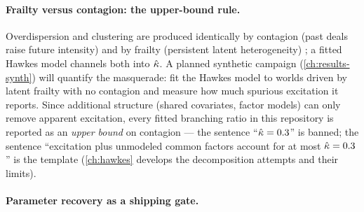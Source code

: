 \paragraph{Frailty versus contagion: the upper-bound rule.}
Overdispersion and clustering are produced identically by contagion
(past deals raise future intensity) and by frailty (persistent latent
heterogeneity) \citep{duffie2009,azizpour2018}; a fitted Hawkes model
channels both into $\hat{\kappa}$. A planned synthetic campaign
(\cref{ch:results-synth}) will quantify the masquerade: fit the Hawkes
model to worlds driven by latent frailty with no contagion and measure
how much spurious excitation it reports.
Since additional structure (shared covariates, factor models) can only
remove apparent excitation, every fitted branching ratio in this
repository is reported as an \emph{upper bound} on contagion --- the
sentence ``$\hat{\kappa}=0.3$'' is banned; the sentence ``excitation plus
unmodeled common factors account for at most $\hat{\kappa}=0.3$'' is the
template (\cref{ch:hawkes} develops the decomposition attempts and their
limits).

\paragraph{Parameter recovery as a shipping gate.}

